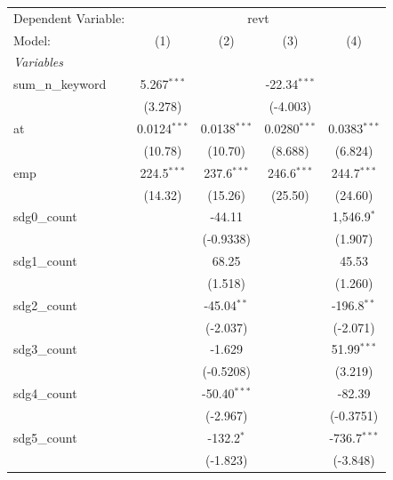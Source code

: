 
\begingroup
\centering
\begin{tabular}{lcccc}
   \tabularnewline \midrule \midrule
   Dependent Variable: & \multicolumn{4}{c}{revt}\\
   Model:            & (1)            & (2)            & (3)            & (4)\\  
   \midrule
   \emph{Variables}\\
   sum\_n\_keyword   & 5.267$^{***}$  &                & -22.34$^{***}$ &   \\   
                     & (3.278)        &                & (-4.003)       &   \\   
   at                & 0.0124$^{***}$ & 0.0138$^{***}$ & 0.0280$^{***}$ & 0.0383$^{***}$\\   
                     & (10.78)        & (10.70)        & (8.688)        & (6.824)\\   
   emp               & 224.5$^{***}$  & 237.6$^{***}$  & 246.6$^{***}$  & 244.7$^{***}$\\   
                     & (14.32)        & (15.26)        & (25.50)        & (24.60)\\   
   sdg0\_count       &                & -44.11         &                & 1,546.9$^{*}$\\   
                     &                & (-0.9338)      &                & (1.907)\\   
   sdg1\_count       &                & 68.25          &                & 45.53\\   
                     &                & (1.518)        &                & (1.260)\\   
   sdg2\_count       &                & -45.04$^{**}$  &                & -196.8$^{**}$\\   
                     &                & (-2.037)       &                & (-2.071)\\   
   sdg3\_count       &                & -1.629         &                & 51.99$^{***}$\\   
                     &                & (-0.5208)      &                & (3.219)\\   
   sdg4\_count       &                & -50.40$^{***}$ &                & -82.39\\   
                     &                & (-2.967)       &                & (-0.3751)\\   
   sdg5\_count       &                & -132.2$^{*}$   &                & -736.7$^{***}$\\   
                     &                & (-1.823)       &                & (-3.848)\\   

\end{tabular}
